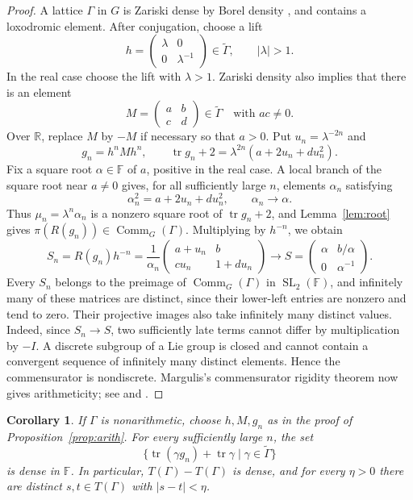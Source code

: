 \documentclass[reqno]{amsart}
\newtheorem{corollary}[theorem]{Corollary}
\theoremstyle{remark}
\DeclareMathOperator{\tr}{tr}
\DeclareMathOperator{\Comm}{Comm}
\DeclareMathOperator{\SL}{SL}
\newcommand{\R}{\mathbb R}
\newcommand{\F}{\mathbb F}
\newcommand{\G}{\widetilde\Gamma}
\begin{document}
\begin{proof}
A lattice $\Gamma$ in $G$ is Zariski dense by Borel density \cite[Proposition 4.7.1]{Morris}, and contains a loxodromic element. After conjugation, choose a lift
$$
h=\begin{pmatrix}\lambda&0\\0&\lambda^{-1}\end{pmatrix}\in\G,
\qquad |\lambda|>1.
$$
In the real case choose the lift with $\lambda>1$. Zariski density also implies that there is an element
$$
M=\begin{pmatrix}a&b\\c&d\end{pmatrix}\in\G
\quad\text{with }ac\ne0.
$$
Over $\R$, replace $M$ by $-M$ if necessary so that $a>0$. Put $u_n=\lambda^{-2n}$ and
$$
g_n=h^nMh^n,\qquad
\tr g_n+2=\lambda^{2n}(a+2u_n+d u_n^2).
$$
Fix a square root $\alpha\in\F$ of $a$, positive in the real case. A local branch of the square root near $a\ne0$ gives, for all sufficiently large $n$, elements $\alpha_n$ satisfying
$$
\alpha_n^2=a+2u_n+d u_n^2,\qquad \alpha_n\longrightarrow\alpha.
$$
Thus $\mu_n=\lambda^n\alpha_n$ is a nonzero square root of $\tr g_n+2$, and Lemma~\ref{lem:root} gives $\pi(R(g_n))\in\Comm_G(\Gamma)$. Multiplying by $h^{-n}$, we obtain
\begin{equation}\label{eq:sequence}
S_n=R(g_n)h^{-n}
=\frac1{\alpha_n}
\begin{pmatrix}
a+u_n&b\\
cu_n&1+du_n
\end{pmatrix}
\longrightarrow
S=\begin{pmatrix}\alpha&b/\alpha\\0&\alpha^{-1}\end{pmatrix}.
\end{equation}
Every $S_n$ belongs to the preimage of $\Comm_G(\Gamma)$ in $\SL_2(\F)$, and infinitely many of these matrices are distinct, since their lower-left entries are nonzero and tend to zero. Their projective images also take infinitely many distinct values. Indeed, since $S_n\to S$, two sufficiently late terms cannot differ by multiplication by $-I$. A discrete subgroup of a Lie group is closed and cannot contain a convergent sequence of infinitely many distinct elements. Hence the commensurator is nondiscrete. Margulis's commensurator rigidity theorem now gives arithmeticity; see \cite[\S1, p.~4]{Borel} and \cite[Chapter IX]{Margulis}.
\end{proof}

\begin{corollary}\label{cor:dense}
If $\Gamma$ is nonarithmetic, choose $h,M,g_n$ as in the proof of Proposition~\ref{prop:arith}. For every sufficiently large $n$, the set
$$
\{\tr(\gamma g_n)+\tr\gamma \mid \gamma\in\G\}
$$
is dense in $\F$. In particular, $T(\Gamma)-T(\Gamma)$ is dense, and for every $\eta>0$ there are distinct $s,t\in T(\Gamma)$ with $|s-t|<\eta$.
\end{corollary}
\end{document}
